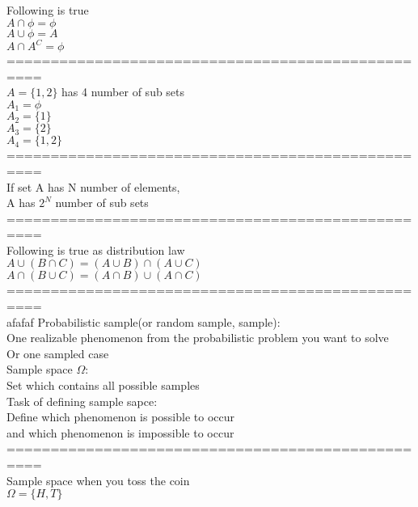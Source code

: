 \documentclass{article}
\begin{document}
Following is true \\ 
$A\cap \phi=\phi$ \\ 
$A\cup \phi=A$ \\ 
$A\cap A^C=\phi$ \\ 

================================================== \\
$A=\{1,2\}$ has 4 number of sub sets \\ 

$A_1=\phi$ \\
$A_2=\{1\}$ \\
$A_3=\{2\}$ \\
$A_4=\{1,2\}$ \\

================================================== \\
If set A has N number of elements, \\ 
A has $2^N$ number of sub sets \\ 

================================================== \\
Following is true as distribution law \\ 
$A\cup(B\cap C)=(A\cup B)\cap(A\cup C)$ \\ 
$A\cap(B\cup C)=(A\cap B)\cup(A\cap C)$ \\ 

================================================== \\

afafaf
Probabilistic sample(or random sample, sample): \\ 
One realizable phenomenon from the probabilistic problem you want to solve \\ 
Or one sampled case \\ 

Sample space $\Omega$: \\ 
Set which contains all possible samples \\ 

Task of defining sample sapce: \\
Define which phenomenon is possible to occur \\
and which phenomenon is impossible to occur \\ 

================================================== \\
Sample space when you toss the coin \\ 
$\Omega =\{H,T\}$ \\ 
\end{document}
